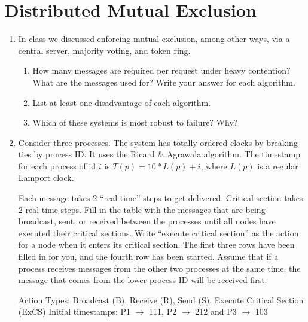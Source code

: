\documentclass{article}
\def\answer#1{
    \vspace*{0.5em}\\
    \noindent\fbox{%
    \parbox{\textwidth}{%
		#1
    }%
}
}
\begin{document}
\section{Distributed Mutual Exclusion}
\begin{enumerate}
\item In class we discussed enforcing mutual exclusion, among other ways, via a central server, majority voting, and token ring. 
    \begin{enumerate}
    \item How many messages are required per request under heavy contention? What are the messages used for? Write your answer for each algorithm.
    \item List at least one disadvantage of each algorithm.
    \item Which of these systems is most robust to failure? Why?
    \end{enumerate}
\item Consider three processes. The system has totally ordered clocks by breaking ties by process ID. It uses the Ricard $\&$ Agrawala algorithm. The timestamp for each process of id $i$ is $T(p) = 10*L(p) + i$, where $L(p)$ is a regular Lamport clock. 

Each message takes 2 “real-time” steps to get delivered. Critical section takes 2 real-time steps. Fill in the table with the messages that are being broadcast, sent, or received between the processes until all nodes have executed their critical sections. Write “execute critical section” as the action for a node when it enters its critical section. The first three rows have been filled in for you, and the fourth row has been started. Assume that if a process receives messages from the other two processes at the same time, the message that comes from the lower process ID will be received first.  


Action Types: Broadcast (B), Receive (R), Send (S),  Execute Critical Section (ExCS)
Initial timestamps: P1 $\rightarrow$ 111, P2 $\rightarrow$ 212 and P3 $\rightarrow$ 103


\end{enumerate}
\end{document}
